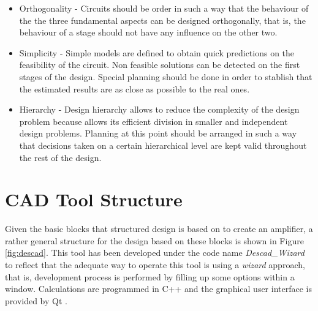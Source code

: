 \documentclass[twocolumn]{IEEEtran}
\begin{document}
\begin{itemize}
\item Orthogonality - Circuits should be order in such a way that the behaviour of the the three fundamental aspects can be designed orthogonally, that is, the behaviour of a stage should not have any influence on the other two.
\item Simplicity - Simple models are defined to obtain quick predictions on the feasibility of the circuit. Non feasible solutions can be detected on the first stages of the design. Special planning should be done in order to stablish that the estimated results are as close as possible to the real ones.
\item Hierarchy - Design hierarchy allows to reduce the complexity of the design problem because allows its efficient division in smaller and independent design problems. Planning at this point should be arranged in such a way that decisions taken on a certain hierarchical level are kept valid throughout the rest of the design.
\end{itemize}

\section{CAD Tool Structure}
Given the basic blocks that structured design is based on to create an amplifier, a rather general structure for the design based on these blocks is shown in Figure \ref{fig:descad}. This tool has been developed under the code name {\it Descad\_Wizard} to reflect that the adequate way to operate this tool is using a {\it wizard} approach, that is, development process is performed by filling up some options within a window. Calculations are programmed in C++ \cite{joyanes} and the graphical user interface is provided by Qt \cite{qt}. 
\end{document}
